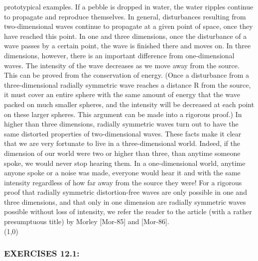 \documentclass[../main.tex]{subfiles}
\begin{document}
prototypical examples. If a pebble is dropped in water, the water ripples continue 
to propagate and reproduce themselves. In general, disturbances resulting from two-dimensional waves continue to propagate at a given point of space, once they 
have reached this point. In one and three dimensions, once the disturbance of a 
wave passes by a certain point, the wave is finished there and moves on. In three 
dimensions, however, there is an important difference from one-dimensional 
waves. The intensity of the wave decreases as we move away from the source. 
This can be proved from the conservation of energy. (Once a disturbance from a 
three-dimensional radially symmetric wave reaches a distance R from the source, 
it must cover an entire sphere with the same amount of energy that the wave 
packed on much smaller spheres, and the intensity will be decreased at each point 
on these larger spheres. This argument can be made into a rigorous proof.) In 
higher than three dimensions, radially symmetric waves turn out to have the same 
distorted properties of two-dimensional waves. These facts make it clear that we 
are very fortunate to live in a three-dimensional world. Indeed, if the dimension of 
our world were two or higher than three, than anytime someone spoke, we would 
never stop hearing them. In a one-dimensional world, anytime anyone spoke or a 
noise was made, everyone would hear it and with the same intensity regardless of 
how far away from the source they were! For a rigorous proof that radially 
symmetric distortion-free waves are only possible in one and three dimensions, 
and that only in one dimension are radially symmetric waves possible without loss 
of intensity, we refer the reader to the article (with a rather presumptuous title) by 
Morley [Mor-85] and [Mor-86].  
\\
\line(1,0){\textwidth}
\subsubsection{EXERCISES 12.1:}
\end{document}
